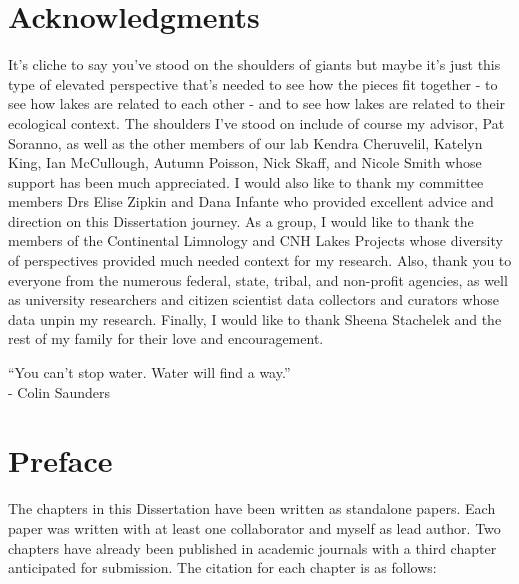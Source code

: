 \documentclass[]{msu-thesis}
\theoremstyle{definition}
\theoremstyle{definition}
\theoremstyle{definition}
\theoremstyle{remark}
\begin{document}
\makecopyrightpage

%
%

\chapter*{Acknowledgments}
\DoubleSpacing %
It’s cliche to say you’ve stood on the shoulders of giants but maybe it’s just this type of elevated perspective that’s needed to see how the pieces fit together - to see how lakes are related to each other - and to see how lakes are related to their ecological context. The shoulders I’ve stood on include of course my advisor, Pat Soranno, as well as the other members of our lab Kendra Cheruvelil, Katelyn King, Ian McCullough, Autumn Poisson, Nick Skaff, and Nicole Smith whose support has been much appreciated. I would also like to thank my committee members Drs Elise Zipkin and Dana Infante who provided excellent advice and direction on this Dissertation journey. As a group, I would like to thank the members of the Continental Limnology and CNH Lakes Projects whose diversity of perspectives provided much needed context for my research. Also, thank you to everyone from the numerous federal, state, tribal, and non-profit agencies, as well as university researchers and citizen scientist data collectors and curators whose data unpin my research. Finally, I would like to thank Sheena Stachelek and the rest of my family for their love and encouragement.

\vspace{2em}
\noindent
“You can’t stop water. Water will find a way.” \\
- Colin Saunders

\clearpage

\chapter*{Preface}
\DoubleSpacing

The chapters in this Dissertation have been written as standalone papers. Each paper was written with at least one collaborator and myself as lead author. Two chapters have already been published in academic journals with a third chapter anticipated for submission. The citation for each chapter is as follows:
\vspace{0.3em}
\end{document}
